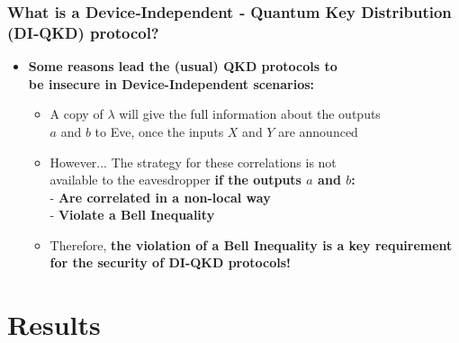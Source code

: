 \documentclass{beamer}
\begin{document}
		\begin{frame}
			\frametitle{\footnotesize What is a Device‑Independent ‑ Quantum Key Distribution (DI‑QKD) protocol?}

            \vspace{1ex}
            \begin{itemize}
                \item \textbf{Some reasons lead the (usual) QKD protocols to\\ be insecure in Device-Independent scenarios:}
                \begin{itemize}
                    \item A copy of $\lambda$ will give the full information about the outputs\\ $a$ and $b$ to Eve, once the inputs $X$ and $Y$ are announced
                    \vspace{1ex}
                    \item However... The strategy for these correlations is not\\ available to the eavesdropper \textbf{if the outputs $a$ and $b$:}\\
                    - \textbf{Are correlated in a non-local way}\\
                    - \textbf{Violate a Bell Inequality}
                    \vspace{1ex}
                    \item Therefore, \textbf{the violation of a Bell Inequality is a key requirement for the security of DI-QKD protocols!}
                \end{itemize}
            \end{itemize}
		\end{frame}

    \section{Results}
\end{document}
